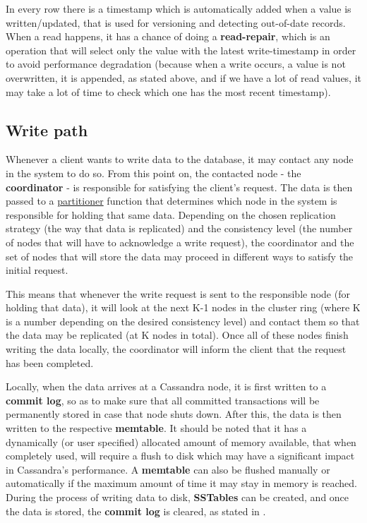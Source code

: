 \documentclass[runningheads]{llncs}
\begin{document}
In every row there is a timestamp which is automatically added when a value is written/updated, that is used for versioning and detecting out-of-date records. When a read happens, it has a chance of doing a \textbf{read-repair}, which is an operation that will select only the value with the latest write-timestamp in order to avoid performance degradation (because when a write occurs, a value is not overwritten, it is appended, as stated above, and if we have a lot of read values, it may take a lot of time to check which one has the most recent timestamp).\par

\subsection{Write path}
Whenever a client wants to write data to the database, it may contact any node in the system to do so. From this point on, the contacted node - the \textbf{coordinator} - is responsible for satisfying the client's request.
The data is then passed to a \underline{partitioner} function that determines which node in the system is responsible for holding that same data. Depending on the chosen replication strategy (the way that data is replicated) and the consistency level (the number of nodes that will have to acknowledge a write request), the coordinator and the set of nodes that will store the data may proceed in different ways to satisfy the initial request.\par

This means that whenever the write request is sent to the responsible node (for holding that data), it will look at the next K-1 nodes in the cluster ring (where K is a number depending on the desired consistency level) and contact them so that the data may be replicated (at K nodes in total). Once all of these nodes finish writing the data locally, the coordinator will inform the client that the request has been completed. \par

Locally, when the data arrives at a Cassandra node, it is first written to a \textbf{commit log}, so as to make sure that all committed transactions will be permanently stored in case that node shuts down. After this, the data is then written to the respective \textbf{memtable}. It should be noted that it has a dynamically (or user specified) allocated amount of memory available, that when completely used, will require a flush to disk which may have a significant impact in Cassandra's performance. A \textbf{memtable} can also be flushed manually or automatically if the maximum amount of time it may stay in memory is reached. During the process of writing data to disk, \textbf{SSTables} can be created, and once the data is stored, the \textbf{commit log} is cleared, as stated in \cite{dzone}.\par
\end{document}
